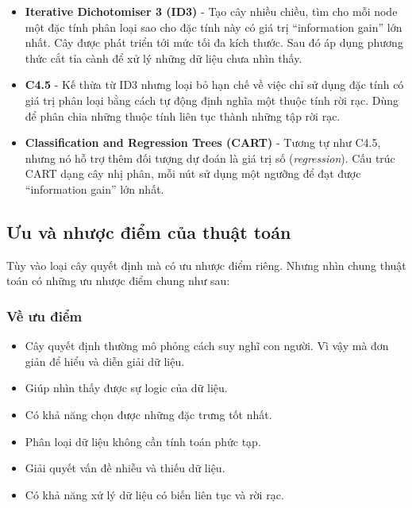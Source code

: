 \documentclass[../main-report.tex]{subfiles}
\begin{document}
\begin{itemize}
\item \textbf{Iterative Dichotomiser 3 (ID3)} - Tạo cây nhiều chiều, tìm cho mỗi node một đặc tính phân loại sao cho đặc tính này có giá trị ``information gain'' lớn nhất. Cây được phát triển tới mức tối đa kích thước. Sau đó áp dụng phương thức cắt tỉa cành để xử lý những dữ liệu chưa nhìn thấy.
\item \textbf{C4.5} - Kế thừa từ ID3 nhưng loại bỏ hạn chế về việc chỉ sử dụng đặc tính có giá trị phân loại bằng cách tự động định nghĩa một thuộc tính rời rạc. Dùng để phân chia những thuộc tính liên tục thành những tập rời rạc.
\item \textbf{Classification and Regression Trees (CART)} - Tương tự như C4.5, nhưng nó hỗ trợ thêm đối tượng dự đoán là giá trị số (\emph{\gls{regression}}). Cấu trúc CART dạng cây nhị phân, mỗi nút sử dụng một ngưỡng để đạt được ``information gain'' lớn nhất.
\end{itemize}

%

\subsection{Ưu và nhược điểm của thuật toán}
Tùy vào loại cây quyết định mà có ưu nhược điểm riêng. Nhưng nhìn chung thuật toán có những ưu nhược điểm chung như sau:
\subsubsection*{Về ưu điểm}
\begin{itemize}
\item Cây quyết định thường mô phỏng cách suy nghĩ con người. Vì vậy mà đơn giản để hiểu và diễn giải dữ liệu.
\item Giúp nhìn thấy được sự logic của dữ liệu.
\item Có khả năng chọn được những đặc trưng tốt nhất.
\item Phân loại dữ liệu không cần tính toán phức tạp.
\item Giải quyết vấn đề nhiễu và thiếu dữ liệu.
\item Có khả năng xử lý dữ liệu có biến liên tục và rời rạc.
\end{itemize}
\end{document}
